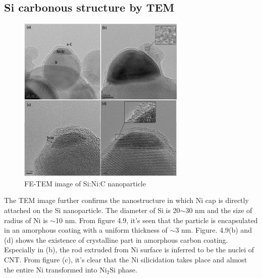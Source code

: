 \subsection{Si carbonous structure by TEM}
\begin{figure}[H]
\centering
\includegraphics[width=8cm]{src/fig/fig50.png}
\caption{FE-TEM image of Si:Ni:C nanoparticle}
\end{figure}
The TEM image further confirms the nanostructure in which Ni cap is directly attached on the Si nanoparticle. The diameter of Si is 20$\sim$30 nm and the size of radius of Ni is $\sim$10 nm. From figure 4.9, it’s seen that the particle is encapsulated in an amorphous coating with a uniform thickness of $\sim$3 nm. Figure. 4.9(b) and (d) shows the existence of crystalline part in amorphous carbon coating. Especially in (b), the rod extruded from Ni surface is inferred to be the nuclei of CNT.  From figure (c), it’s clear that the Ni silicidation takes place and almost the entire Ni transformed into $\mathrm{Ni_{2}Si}$ phase. 
  
